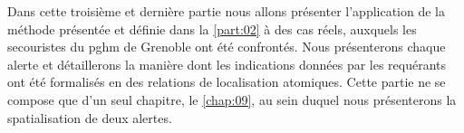 Dans cette troisième et dernière partie nous allons présenter
l’application de la méthode présentée et définie dans la
\autoref{part:02} à des cas réels, auxquels les secouristes du
\ac{pghm} de Grenoble ont été confrontés. Nous présenterons chaque
alerte et détaillerons la manière dont les indications données par les
requérants ont été formalisés en des relations de localisation
atomiques. Cette partie ne se compose que d'un seul chapitre, le \ref{chap:09},
au sein duquel nous présenterons la spatialisation de deux alertes.

